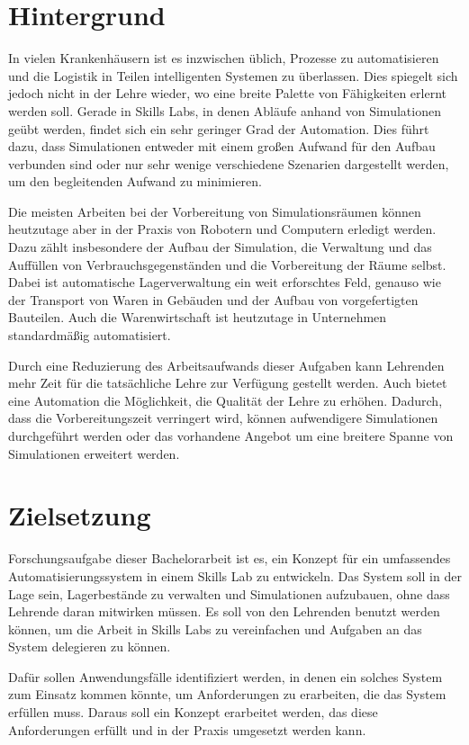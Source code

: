 \section{Hintergrund}

In vielen Krankenhäusern ist es inzwischen üblich, Prozesse zu automatisieren und die Logistik in Teilen intelligenten Systemen zu überlassen. Dies spiegelt sich jedoch nicht in der Lehre wieder, wo eine breite Palette von Fähigkeiten erlernt werden soll. Gerade in Skills Labs, in denen Abläufe anhand von Simulationen geübt werden, findet sich ein sehr geringer Grad der Automation. Dies führt dazu, dass Simulationen entweder mit einem großen Aufwand für den Aufbau verbunden sind oder nur sehr wenige verschiedene Szenarien dargestellt werden, um den begleitenden Aufwand zu minimieren.

Die meisten Arbeiten bei der Vorbereitung von Simulationsräumen können heutzutage aber in der Praxis von Robotern und Computern erledigt werden. Dazu zählt insbesondere der Aufbau der Simulation, die Verwaltung und das Auffüllen von Verbrauchsgegenständen und die Vorbereitung der Räume selbst. Dabei ist automatische Lagerverwaltung ein weit erforschtes Feld, genauso wie der Transport von Waren in Gebäuden und der Aufbau von vorgefertigten Bauteilen. Auch die Warenwirtschaft ist heutzutage in Unternehmen standardmäßig automatisiert.

Durch eine Reduzierung des Arbeitsaufwands dieser Aufgaben kann Lehrenden mehr Zeit für die tatsächliche Lehre zur Verfügung gestellt werden. Auch bietet eine Automation die Möglichkeit, die Qualität der Lehre zu erhöhen. Dadurch, dass die Vorbereitungszeit verringert wird, können aufwendigere Simulationen durchgeführt werden oder das vorhandene Angebot um eine breitere Spanne von Simulationen erweitert werden.


\section{Zielsetzung}

Forschungsaufgabe dieser Bachelorarbeit ist es, ein Konzept für ein umfassendes Automatisierungssystem in einem Skills Lab zu entwickeln. Das System soll in der Lage sein, Lagerbestände zu verwalten und Simulationen aufzubauen, ohne dass Lehrende daran mitwirken müssen. Es soll von den Lehrenden benutzt werden können, um die Arbeit in Skills Labs zu vereinfachen und Aufgaben an das System delegieren zu können.

Dafür sollen Anwendungsfälle identifiziert werden, in denen ein solches System zum Einsatz kommen könnte, um Anforderungen zu erarbeiten, die das System erfüllen muss. Daraus soll ein Konzept erarbeitet werden, das diese Anforderungen erfüllt und in der Praxis umgesetzt werden kann.


